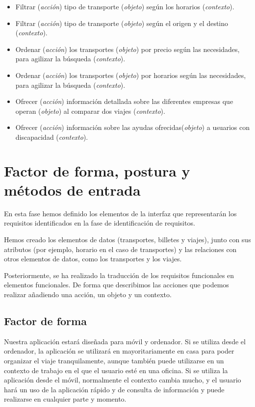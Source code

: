 \begin{itemize}
            (\textit{contexto}).
      \item Filtrar (\textit{acción}) tipo de transporte (\textit{objeto}) según los
            horarios (\textit{contexto}).
      \item Filtrar (\textit{acción}) tipo de transporte (\textit{objeto}) según el origen
            y el destino (\textit{contexto}).
      \item Ordenar (\textit{acción}) los transportes (\textit{objeto}) por precio según
            las necesidades, para agilizar la búsqueda (\textit{contexto}).
      \item Ordenar (\textit{acción}) los transportes (\textit{objeto}) por horarios según
            las necesidades, para agilizar la búsqueda (\textit{contexto}).
      \item Ofrecer (\textit{acción}) información detallada sobre las diferentes empresas
            que operan (\textit{objeto}) al comparar dos viajes (\textit{contexto}).
      \item Ofrecer (\textit{acción}) información sobre las ayudas
            ofrecidas(\textit{objeto}) a usuarios con discapacidad (\textit{contexto}).
\end{itemize}

\section{Factor de forma, postura y métodos de entrada}

En esta fase hemos definido los elementos de la interfaz que representarán los
requisitos identificados en la fase de identificación de requisitos.

Hemos creado los elementos de datos (transportes, billetes y viajes), junto con
sus atributos (por ejemplo, horario en el caso de transportes) y las relaciones
con otros elementos de datos, como los transportes y los viajes.

Posteriormente, se ha realizado la traducción de los requisitos funcionales en
elementos funcionales. De forma que describimos las acciones que podemos
realizar añadiendo una acción, un objeto y un contexto.

\subsection{Factor de forma}
Nuestra aplicación estará diseñada para móvil y ordenador. Si se utiliza desde
el ordenador, la aplicación se utilizará en mayoritariamente en casa para poder
organizar el viaje tranquilamente, aunque también puede utilizarse en un
contexto de trabajo en el que el usuario esté en una oficina. Si se utiliza la
aplicación desde el móvil, normalmente el contexto cambia mucho, y el usuario
hará un uso de la aplicación rápido y de consulta de información y puede
realizarse en cualquier parte y momento.

